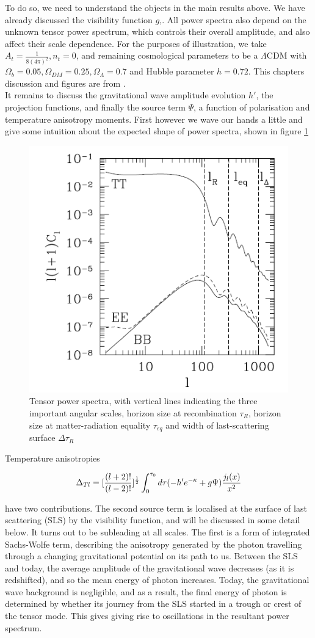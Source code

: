 \documentclass[a4paper,10pt]{article}
\newcommand{\half}{\frac{1}{2}}
\newcommand{\ltwo}{[\frac{(l+2)!}{(l-2)!}]}
\begin{document}
To do so, we need to understand the objects in the main results above. We have already discussed the visibility function $g$,. All power spectra also depend on the unknown tensor power spectrum, which controls their overall amplitude, and also affect their scale dependence. For the purposes of illustration, we take  $A_t = \frac{1}{8(4\pi)^2}, n_t=0$, and remaining cosmological parameters to be a $\Lambda$CDM with $\Omega_b=0.05, \Omega_{DM}=0.25, \Omega_\Lambda=0.7$ and Hubble parameter $h=0.72$. This chapters discussion and figures are from \cite{Pritchard}.\\

It remains to discuss the gravitational wave amplitude evolution $h'$, the projection functions, and finally the source term $\Psi$, a function of polarisation and temperature anisotropy moments. First however we wave our hands a little and give some intuition about the expected shape of power spectra, shown in figure \ref{tensorpower}

\begin{figure}[h]
  \includegraphics[width=0.5\linewidth]{tensorpowerspectra.png}
  \centering
  \caption{Tensor power spectra, with vertical lines indicating the three important angular scales, horizon size at recombination $\tau_R$, horizon size at matter-radiation equality $\tau_{eq}$ and width of last-scattering surface $\Delta\tau_R$}
  \label{tensorpower}
\end{figure}


Temperature anisotropies 

\begin{equation}
\Delta_{Tl} = \ltwo^\half \int_0^{\tau_0} d\tau (-h'e^{-\kappa}+g\Psi)\frac{j_l(x)}{x^2}\\
\end{equation}

have two contributions. The second source term is localised at the surface of last scattering (SLS) by the visibility function, and will be discussed in some detail below. It turns out to be subleading at all scales. The first is a form of integrated Sachs-Wolfe term, describing the anisotropy generated by the photon travelling through a changing gravitational potential on its path to us. Between the SLS and today, the average amplitude of the gravitational wave decreases (as it is redshifted), and so the mean energy of photon increases. Today, the gravitational wave background is negligible, and as a result, the final energy of photon is determined by whether its journey from the SLS started in a trough or crest of the tensor mode. This gives giving rise to oscillations in the resultant power spectrum.\\
\end{document}
